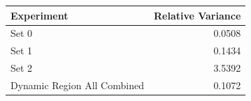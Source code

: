 \begin{tabular}{lr}
\toprule
Experiment & Relative Variance \\
\midrule
Set 0 & 0.0508 \\
Set 1 & 0.1434 \\
Set 2 & 3.5392 \\
Dynamic Region All Combined & 0.1072 \\
\bottomrule
\end{tabular}
